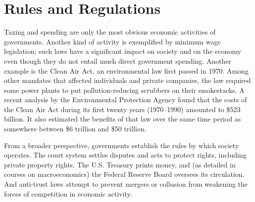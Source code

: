 \section{Rules and Regulations}

Taxing and spending are only the most obvious economic activities of governments. Another kind of activity is exemplified by minimum wage legislation; such laws have a significant impact on society and on the economy even though they do not entail much direct government spending. Another example is the Clean Air Act, an environmental law first passed in 1970. Among other mandates that affected individuals and private companies, the law required some power plants to put pollution-reducing scrubbers on their smokestacks. A recent analysis by the Environmental Protection Agency found that the costs of the Clean Air Act during its first twenty years (1970--1990) amounted to \$523 billion. It also estimated the benefits of that law over the same time period as somewhere between \$6 trillion and \$50 trillion. 

From a broader perspective, governments establish the rules by which society operates. The court system settles disputes and acts to protect rights, including private property rights. The U.S. Treasury prints money, and (as detailed in courses on macroeconomics) the Federal Reserve Board oversees its circulation. And anti-trust laws attempt to prevent mergers or collusion from weakening the forces of competition in economic activity. 





